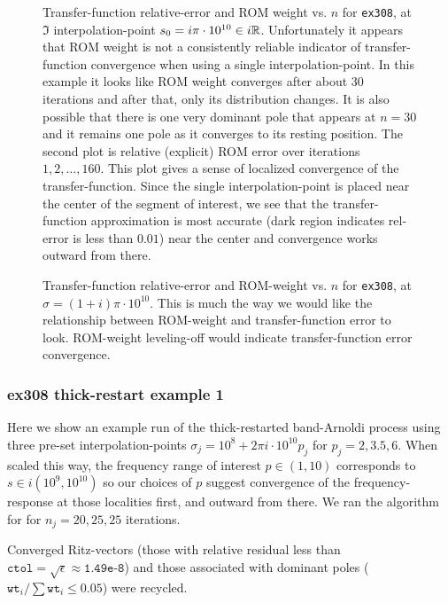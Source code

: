 \begin{figure}
\centering
{}
\caption{\label{fig:308benchmark2} Transfer-function relative-error and ROM weight vs. $n$ for \texttt{ex308}, at $\Im$ interpolation-point $s_0 = i \pi\cdot10^{10}\in i \mathbb{R}$.   Unfortunately it appears that ROM weight is not
a consistently reliable indicator of transfer-function convergence when using a single interpolation-point.   In this example it looks like ROM weight converges after about 30 iterations and after that, only its distribution changes. It is also possible that there is one very dominant pole that appears at $n=30$ and it remains one pole as it converges to its resting position.
The second plot is relative (explicit) ROM error over iterations $1,2,\ldots,160$.  This plot gives a sense of localized convergence of the transfer-function.  Since the single interpolation-point is placed near the center of the segment of interest, we see that the transfer-function approximation is most accurate (dark region indicates rel-error is less than $0.01$) near the center and convergence works outward from there.}
\end{figure}

\begin{figure}
\caption{\label{fig:308benchmark3} Transfer-function relative-error and ROM-weight vs. $n$ for \texttt{ex308}, at $\sigma = (1+i)\pi\cdot10^{10}$.   This is much the way we would like the relationship between ROM-weight and transfer-function error to look.    ROM-weight leveling-off would indicate transfer-function error convergence.}
\end{figure}

\clearpage

\subsubsection{ex308 thick-restart example 1}
Here we show an example run of the thick-restarted band-Arnoldi process using three pre-set interpolation-points $\sigma_j = 10^8 + 2\pi i \cdot 10^{10} p_j$ for   $p_j =2, 3.5, 6$.  When scaled this way, the frequency range of interest $p\in (1,10)$ corresponds to $s\in i(10^9,10^{10})$ so our choices of $p$ suggest convergence of the frequency-response at those localities first, and outward from there.      We ran the algorithm for  for $n_j=20,25,25$ iterations. 

 Converged Ritz-vectors (those with relative residual less than $\texttt{ctol}=\sqrt{\epsilon}\approx \texttt{1.49e-8}$) and those associated with dominant poles ($\texttt{wt}_i/\sum\texttt{wt}_i\leq 0.05$) were recycled.  
   

